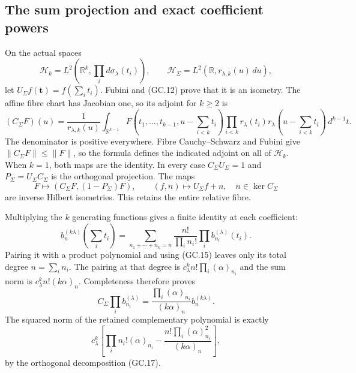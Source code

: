 \subsection{The sum projection and exact coefficient powers}

On the actual spaces
\[
 \mathcal H_k=L^2(\mathbb R^k,\prod_i d\sigma_\lambda(t_i)),
 \qquad\mathcal H_\Sigma=L^2(\mathbb R,r_{\lambda,k}(u)\,du),
\]
let $U_\Sigma f(\mathbf t)=f(\sum_i t_i)$. Fubini and (GC.12)
prove that it is an isometry. The affine fibre chart has Jacobian one,
so its adjoint for $k\ge2$ is
\[
 (C_\Sigma F)(u)=\frac1{r_{\lambda,k}(u)}
 \int_{\mathbb R^{k-1}}F(t_1,\ldots,t_{k-1},u-\sum_{i<k}t_i)
 \prod_{i<k}r_\lambda(t_i)r_\lambda(u-\sum_{i<k}t_i)
 \,d^{k-1}t.                                                  \tag{GC.16}
\]
The denominator is positive everywhere. Fibre Cauchy--Schwarz and
Fubini give $\|C_\Sigma F\|\le\|F\|$, so the formula defines
the indicated adjoint on all of $\mathcal H_k$. When $k=1$, both
maps are the identity. In every case $C_\Sigma U_\Sigma=1$ and
$P_\Sigma=U_\Sigma C_\Sigma$ is the orthogonal projection. The maps
\[
 F\mapsto(C_\Sigma F,(1-P_\Sigma)F),\qquad
 (f,n)\mapsto U_\Sigma f+n,\quad n\in\ker C_\Sigma              \tag{GC.17}
\]
are inverse Hilbert isometries. This retains the entire relative fibre.

Multiplying the $k$ generating functions gives a finite identity at
each coefficient:
\[
 b_n^{(k\lambda)}(\sum_i t_i)=
 \sum_{n_1+\cdots+n_k=n}\frac{n!}{\prod_i n_i!}
                    \prod_i b_{n_i}^{(\lambda)}(t_i).
                                                               \tag{GC.18}
\]
Pairing it with a product polynomial and using (GC.15) leaves only
its total degree $n=\sum_i n_i$. The pairing at that degree is
$c_\lambda^k n!\prod_i(\alpha)_{n_i}$ and the sum norm is
$c_\lambda^k n!(k\alpha)_n$. Completeness therefore proves
\[
 C_\Sigma\prod_i b_{n_i}^{(\lambda)}
   =\frac{\prod_i(\alpha)_{n_i}}{(k\alpha)_n}b_n^{(k\lambda)}.
                                                               \tag{GC.19}
\]
The squared norm of the retained complementary polynomial is exactly
\[
 c_\lambda^k\left[
  \prod_i n_i!(\alpha)_{n_i}
  -\frac{n!\prod_i(\alpha)_{n_i}^2}{(k\alpha)_n}\right],
                                                               \tag{GC.20}
\]
by the orthogonal decomposition (GC.17).

